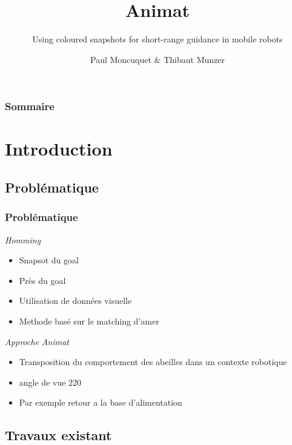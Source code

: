 \documentclass{beamer}
\title{Animat}
\subtitle{Using coloured snapshots for short-range guidance in mobile robots}
\author{Paul Moncuquet \& Thibaut Munzer}
\begin{document}
\begin{frame}
  \titlepage
\end{frame}

\begin{frame}
  \frametitle{Sommaire}
  \tableofcontents%
\end{frame}

\section{Introduction}

\subsection{Problématique}

\begin{frame}
  \frametitle{Problématique}
  \begin{block}{\textit{Homming}}
  \begin{itemize}
    \item Snapsot du goal
    \item Près du goal
    \item Utilisation de données visuelle
    \item Methode basé sur le matching d'amer    
  \end{itemize}
  \end{block}

  \begin{block}{\textit{Approche Animat}}
  \begin{itemize}
    \item Transposition du comportement des abeilles dans un contexte robotique
    \item angle de vue 220
    \item Par exemple retour a la base d'alimentation
  \end{itemize}
  \end{block}
\end{frame}

\subsection{Travaux existant}
\end{document}
